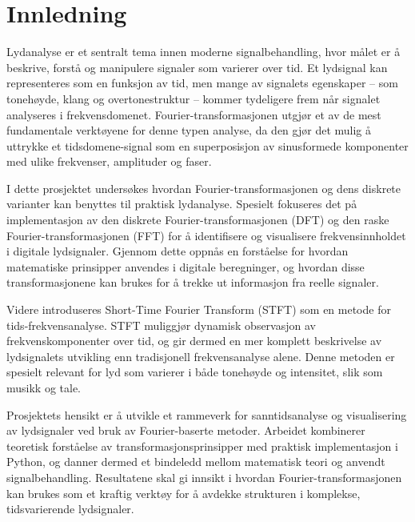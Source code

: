 \section{Innledning}
Lydanalyse er et sentralt tema innen moderne signalbehandling, hvor målet er å beskrive, forstå og manipulere signaler som varierer over tid. Et lydsignal kan representeres som en funksjon av tid, men mange av signalets egenskaper – som tonehøyde, klang og overtonestruktur – kommer tydeligere frem når signalet analyseres i frekvensdomenet. Fourier-transformasjonen utgjør et av de mest fundamentale verktøyene for denne typen analyse, da den gjør det mulig å uttrykke et tidsdomene-signal som en superposisjon av sinusformede komponenter med ulike frekvenser, amplituder og faser.

I dette prosjektet undersøkes hvordan Fourier-transformasjonen og dens diskrete varianter kan benyttes til praktisk lydanalyse. Spesielt fokuseres det på implementasjon av den diskrete Fourier-transformasjonen (DFT) og den raske Fourier-transformasjonen (FFT) for å identifisere og visualisere frekvensinnholdet i digitale lydsignaler. Gjennom dette oppnås en forståelse for hvordan matematiske prinsipper anvendes i digitale beregninger, og hvordan disse transformasjonene kan brukes for å trekke ut informasjon fra reelle signaler.

Videre introduseres Short-Time Fourier Transform (STFT) som en metode for tids-frekvensanalyse. STFT muliggjør dynamisk observasjon av frekvenskomponenter over tid, og gir dermed en mer komplett beskrivelse av lydsignalets utvikling enn tradisjonell frekvensanalyse alene. Denne metoden er spesielt relevant for lyd som varierer i både tonehøyde og intensitet, slik som musikk og tale.

Prosjektets hensikt er å utvikle et rammeverk for sanntidsanalyse og visualisering av lydsignaler ved bruk av Fourier-baserte metoder. Arbeidet kombinerer teoretisk forståelse av transformasjonsprinsipper med praktisk implementasjon i Python, og danner dermed et bindeledd mellom matematisk teori og anvendt signalbehandling. Resultatene skal gi innsikt i hvordan Fourier-transformasjonen kan brukes som et kraftig verktøy for å avdekke strukturen i komplekse, tidsvarierende lydsignaler.